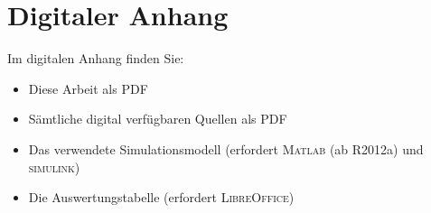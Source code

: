 
\chapter{Digitaler Anhang}
\label{an_Digital}
Im digitalen Anhang finden Sie:
\begin{itemize}
	\item Diese Arbeit als PDF
	\item Sämtliche digital verfügbaren Quellen als PDF
	\item Das verwendete Simulationsmodell (erfordert \textsc{Matlab} (ab R2012a) und \textsc{simulink})
	\item Die Auswertungstabelle (erfordert \textsc{LibreOffice})
\end{itemize}

